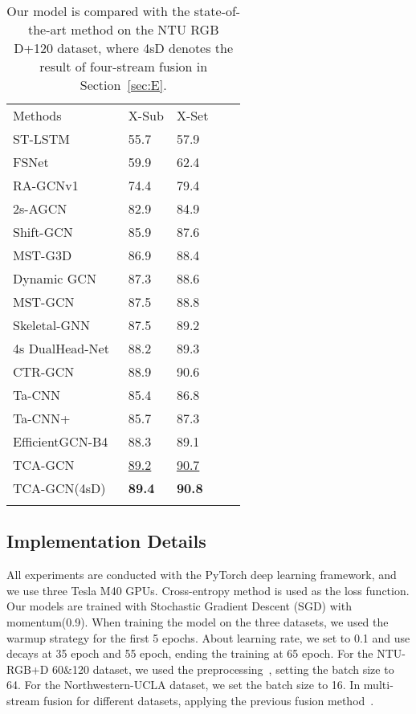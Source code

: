 \documentclass[letterpaper]{article} \usepackage[submission]{aaai23}  \usepackage{times}  \usepackage{helvet}  \usepackage{courier}  \usepackage[hyphens]{url}  \usepackage{graphicx} \urlstyle{rm} \def\UrlFont{\rm}  \usepackage{natbib}  \usepackage{caption} \frenchspacing  \setlength{\pdfpagewidth}{8.5in} \setlength{\pdfpageheight}{11in} \usepackage{algorithm}
\begin{document}
\begin{table}[ht]
 \centering
\begin{tabular}{lllll}
\hline\noalign{\smallskip}
Methods &X-Sub&X-Set\\
\noalign{\smallskip}\hline\noalign{\smallskip}
ST-LSTM~\citeyearpar{2016Spatio}&55.7&57.9\\
FSNet~\citeyearpar{2019Skeleton12}&59.9&62.4\\
RA-GCNv1~\citeyearpar{2019Richly}&74.4&79.4\\
2s-AGCN~\citeyearpar{2018Two}&82.9&84.9\\
Shift-GCN~\citeyearpar{2020Skeletonshift}&85.9&87.6\\
MST-G3D\citeyearpar{2020Disentangling} &86.9&88.4 \\
Dynamic GCN~\citeyearpar{2020Dynamic}&87.3&88.6\\
MST-GCN~\citeyearpar{2021Multi} &87.5&88.8 \\
Skeletal-GNN~\citeyearpar{2021Learning}&87.5&89.2\\
4s DualHead-Net~\citeyearpar{2021Learning1}&88.2&89.3\\
CTR-GCN~\citeyearpar{2021Channel}&88.9&90.6\\
Ta-CNN~\citeyearpar{xu2022topology}&85.4&86.8\\
Ta-CNN+~\citeyearpar{xu2022topology}&85.7&87.3\\
EfficientGCN-B4~\citeyearpar{2021Constructing}&88.3&89.1\\
\noalign{\smallskip}\hline
TCA-GCN&\underline{89.2}& \underline{90.7}\\
TCA-GCN(4sD)&{\bf 89.4}&{\bf 90.8}\\
\noalign{\smallskip}\hline
\end{tabular}\caption{Our model is compared with the state-of-the-art method on the NTU RGB D+120 dataset, where 4sD denotes the result of four-stream fusion in Section~\ref{sec:E}.}
\label{tab:33}
\end{table}

\subsection{Implementation Details}
\label{sec:AB}
All experiments are conducted  with the PyTorch deep learning framework, and we use three Tesla M40 GPUs. Cross-entropy method is used as the loss function. Our models are trained with Stochastic Gradient Descent (SGD) with momentum(0.9).  When training the model on the three datasets, we used the warmup strategy for the first 5 epochs. About learning rate, we set to 0.1 and use decays at 35 epoch and 55 epoch, ending the training at 65 epoch. For the NTU-RGB+D 60$\&$120 dataset, we used the preprocessing~\cite{2020Semantics}, setting the batch size to 64. For the Northwestern-UCLA dataset, we set the batch size to 16. In multi-stream fusion for different datasets, applying the previous fusion method~\cite{2021Channel, 2020Skeletonshift, 2020Dynamic}.
\end{document}
